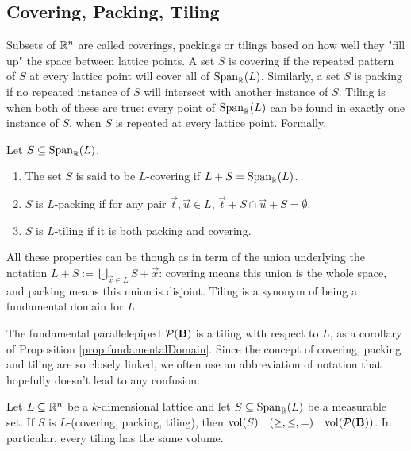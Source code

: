 \subsection{Covering, Packing, Tiling}
Subsets of $\mathbb{R}^n$ are called coverings, packings or tilings based on how well they "fill up" the space between lattice points.
A set $S$ is covering if the repeated pattern of $S$ at every lattice point will cover all of $\operatorname{Span}_{\mathbb{R}}(L)$.
Similarly, a set $S$ is packing if no repeated instance of $S$ will intersect with another instance of $S$.
Tiling is when both of these are true: every point of $\operatorname{Span}_{\mathbb{R}}(L) $ can be found in exactly one instance of $S$, when $S$ is repeated at every lattice point.
Formally,
\begin{definition}
Let $S \subseteq \operatorname{Span}_{\mathbb{R}}(L)$.
\begin{enumerate}
\item The set $S$ is said to be $L$-covering if $L + S = \operatorname{Span}_{\mathbb{R}}(L)$.
\item $S$ is $L$-packing if for any pair $\vec t, \vec u \in L$, $\vec t + S \cap \vec u +S = \emptyset$.
\item $S$ is $L$-tiling if it is both packing and covering.
\end{enumerate}
\end{definition}
All these properties can be though as in term of the union underlying the notation $L + S:= \bigcup_{\vec x \in L} S + \vec x$: covering means this union is the whole space, and packing means this union is disjoint. Tiling is a synonym of being a fundamental domain for $L$.

The fundamental parallelepiped $\mathcal P(\mathbf{B})$ is a tiling with respect to $L$, as a corollary of Proposition \ref{prop:fundamentalDomain}.
Since the concept of covering, packing and tiling are so closely linked, we often use an abbreviation of notation that hopefully doesn't lead to any confusion.

\begin{proposition}\label{prop:pack_cov_volume_vound}
Let $L \subseteq \mathbb{R}^n$ be a $k$-dimensional lattice and let $S \subseteq \operatorname{Span}_{\mathbb{R}}(L)$ be a measurable set.
If $S$ is $L$-(covering, packing, tiling), then $\mathrm{vol}(S) \quad ( \geq,\leq,=) \quad \mathrm{vol}(\mathcal P(\mathbf{B}))$.
In particular, every tiling has the same volume.
\end{proposition}

